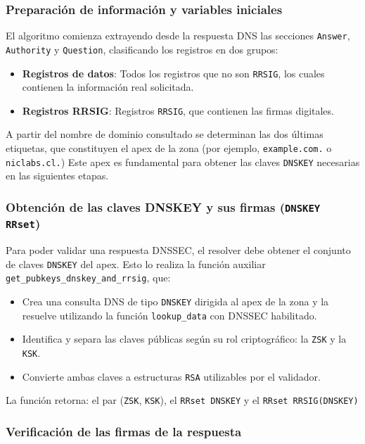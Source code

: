 \subsubsection{Preparación de información y variables iniciales}

El algoritmo comienza extrayendo desde la respuesta DNS las secciones \texttt{Answer}, \texttt{Authority} y \texttt{Question}, clasificando los registros en dos grupos:

\begin{itemize}
    \item \textbf{Registros de datos}: Todos los registros que no son \texttt{RRSIG}, los cuales contienen la información real solicitada.
    \item \textbf{Registros RRSIG}: Registros \texttt{RRSIG}, que contienen las firmas digitales.
\end{itemize}

A partir del nombre de dominio consultado se determinan las dos últimas etiquetas, que constituyen el apex de la zona (por ejemplo, \texttt{example.com.} o \texttt{niclabs.cl.})
Este apex es fundamental para obtener las claves \texttt{DNSKEY} necesarias en las siguientes etapas.

\subsubsection{Obtención de las claves DNSKEY y sus firmas (\texttt{DNSKEY RRset})}

Para poder validar una respuesta DNSSEC, el resolver debe obtener el conjunto de claves \texttt{DNSKEY} del apex. Esto lo realiza la función auxiliar 
\texttt{get\_pubkeys\_dnskey\_and\_rrsig}, que:

\begin{itemize}
    \item Crea una consulta DNS de tipo \texttt{DNSKEY} dirigida al apex de la zona y la resuelve utilizando la función \texttt{lookup\_data} con DNSSEC habilitado.
    \item Identifica y separa las claves públicas según su rol criptográfico: la \texttt{ZSK} y la \texttt{KSK}.
    \item Convierte ambas claves a estructuras \texttt{RSA} utilizables por el validador.
\end{itemize}

La función retorna: el par (\texttt{ZSK}, \texttt{KSK}), el \texttt{RRset DNSKEY} y el \texttt{RRset RRSIG(DNSKEY)}

\subsubsection{Verificación de las firmas de la respuesta}

